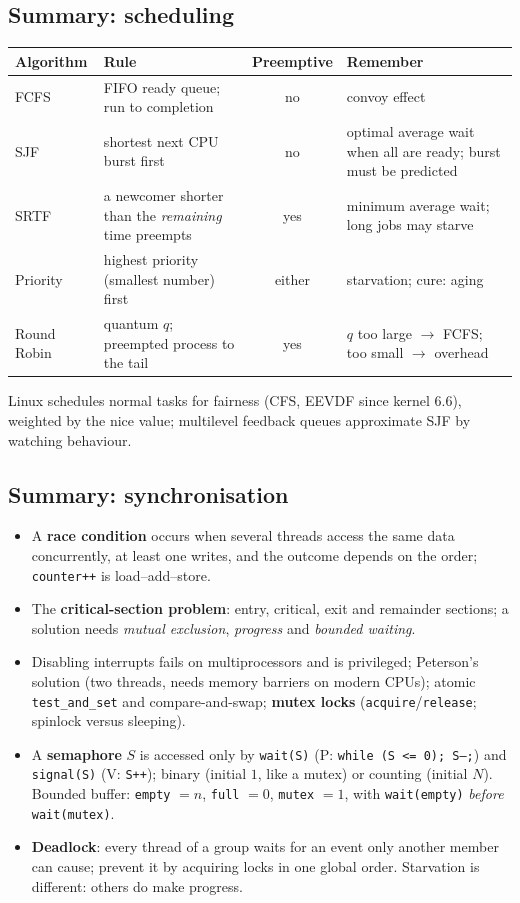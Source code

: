\documentclass[11pt,a4paper]{article}
\newcommand{\term}[1]{\textbf{\color{mintdeep}#1}}
\begin{document}
\subsection*{Summary: scheduling}
\begin{center}
\renewcommand{\arraystretch}{1.25}
\begin{tabularx}{\linewidth}{@{}l >{\raggedright\arraybackslash}X c >{\raggedright\arraybackslash}X@{}}
\toprule
\textbf{Algorithm} & \textbf{Rule} & \textbf{Preemptive} & \textbf{Remember} \\
\midrule
FCFS & FIFO ready queue; run to completion & no & convoy effect \\
SJF & shortest next CPU burst first & no & optimal average wait when all are ready; burst must be predicted \\
SRTF & a newcomer shorter than the \emph{remaining} time preempts & yes & minimum average wait; long jobs may starve \\
Priority & highest priority (smallest number) first & either & starvation; cure: aging \\
Round Robin & quantum $q$; preempted process to the tail & yes & $q$ too large $\to$ FCFS; too small $\to$ overhead \\
\bottomrule
\end{tabularx}
\end{center}
Linux schedules normal tasks for fairness (CFS, EEVDF since kernel 6.6), weighted by the nice value; multilevel feedback queues approximate SJF by watching behaviour.

\subsection*{Summary: synchronisation}
\begin{itemize}
  \item A \term{race condition} occurs when several threads access the same data concurrently, at least one writes, and the outcome depends on the order; \texttt{counter++} is load--add--store.
  \item The \term{critical-section problem}: entry, critical, exit and remainder sections; a solution needs \emph{mutual exclusion}, \emph{progress} and \emph{bounded waiting}.
  \item Disabling interrupts fails on multiprocessors and is privileged; Peterson's solution (two threads, needs memory barriers on modern CPUs); atomic \texttt{test\_and\_set} and compare-and-swap; \term{mutex locks} (\texttt{acquire}/\texttt{release}; spinlock versus sleeping).
  \item A \term{semaphore} $S$ is accessed only by \texttt{wait(S)} (P: \texttt{while (S <= 0); S--;}) and \texttt{signal(S)} (V: \texttt{S++}); binary (initial $1$, like a mutex) or counting (initial $N$). Bounded buffer: \texttt{empty} $= n$, \texttt{full} $= 0$, \texttt{mutex} $= 1$, with \texttt{wait(empty)} \emph{before} \texttt{wait(mutex)}.
  \item \term{Deadlock}: every thread of a group waits for an event only another member can cause; prevent it by acquiring locks in one global order. Starvation is different: others do make progress.
\end{itemize}
\end{document}
